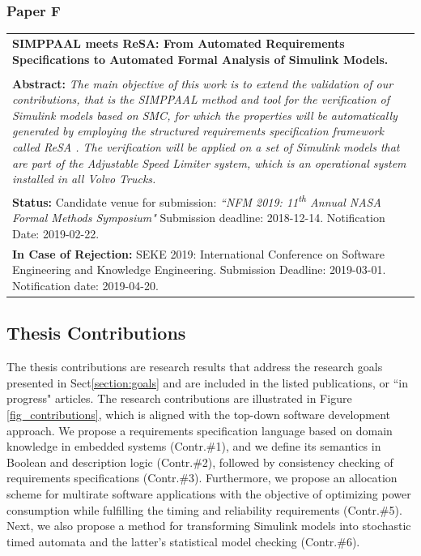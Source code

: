 \subsubsection{Paper F}
\begin{tabular}{p{\textwidth}}
\noindent \textbf{SIMPPAAL meets ReSA: From Automated Requirements Specifications to Automated Formal Analysis of Simulink Models.}\\%
\\[6pt]%
\noindent \textbf{Abstract:} \textit{The main objective of this work is to extend the validation of our contributions, that is the SIMPPAAL method and tool \cite{Filipovikj4714} for the verification of Simulink models based on SMC, for which the properties will be automatically generated by employing the structured requirements specification framework called ReSA \cite{resatool}. The verification will be applied on a set of Simulink models that are part of the Adjustable Speed Limiter system, which is an operational system installed in all Volvo Trucks.}\\[6pt]%
\textbf{Status: }Candidate venue for submission: \textit{``NFM 2019: 11\textsuperscript{th} Annual NASA Formal Methods Symposium"} Submission deadline: 2018-12-14. Notification Date: 2019-02-22.\\%
\textbf{In Case of Rejection: }SEKE 2019: International Conference on Software Engineering and Knowledge Engineering. Submission Deadline: 2019-03-01. Notification date: 2019-04-20.\\%
\end{tabular}

\subsection{Thesis Contributions}\label{subsec_contributions}
The thesis contributions are research results that address the research goals presented in Sect\ref{section:goals} and are included in the listed publications, or ``in progress" articles. The research contributions are illustrated in Figure \ref{fig_contributions}, which is aligned with the top-down software development approach. We propose a requirements specification language based on domain knowledge in embedded systems (Contr.\#1), and we define its semantics in Boolean and description logic (Contr.\#2), followed by consistency checking of requirements specifications (Contr.\#3). Furthermore, we propose an allocation scheme for multirate software applications with the objective of optimizing power consumption while fulfilling the timing and reliability requirements (Contr.\#5). Next, we also propose a method for transforming Simulink models into stochastic timed automata and the latter's statistical model checking (Contr.\#6). 

